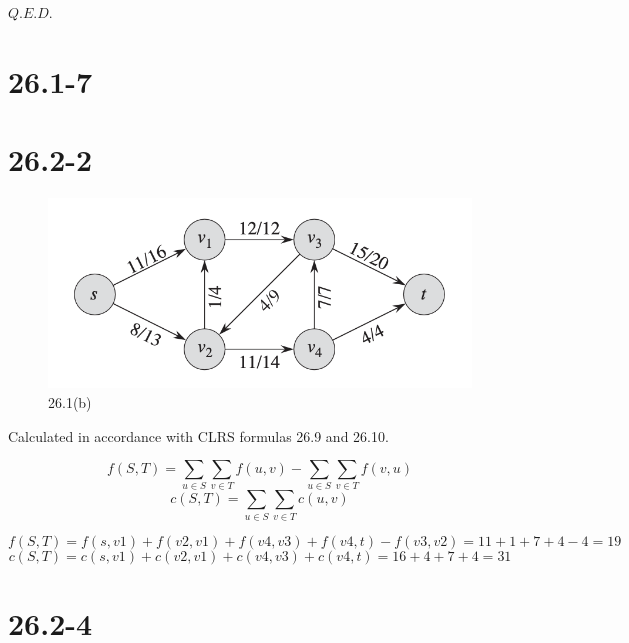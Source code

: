\documentclass[12pt]{article}
\begin{document}
$Q.E.D.$

\section{26.1-7}

\section{26.2-2}
\begin{figure}[h]
    \centering
    \includegraphics[width=0.5\linewidth]{截屏2024-11-18 下午8.46.37.png}
    \caption{26.1(b)}
    \label{fig:enter-label}

\end{figure}
Calculated in accordance with CLRS formulas 26.9 and 26.10.

\[f(S, T) = \sum_{u \in S} \sum_{v \in T} f(u, v) - \sum_{u \in S} \sum_{v \in T} f(v, u)\]
\[c(S, T) = \sum_{u \in S} \sum_{v \in T} c(u, v)\]

\[f(S, T) = f(s,v1)+f(v2,v1)+f(v4,v3)+f(v4,t) - f(v3,v2) = 11+1+7+4-4=19\]
\[c(S, T) = c(s,v1)+c(v2,v1)+c(v4,v3)+c(v4,t)=16+4+7+4=31\]
\section{26.2-4}
\end{document}
